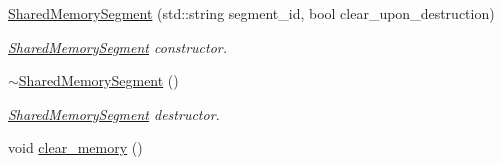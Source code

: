\begin{DoxyCompactItemize}
\item 
\hyperlink{classshared__memory_1_1SharedMemorySegment_ae984411227bd175e684f90c9c28c976c}{Shared\+Memory\+Segment} (std\+::string segment\+\_\+id, bool clear\+\_\+upon\+\_\+destruction)\hypertarget{classshared__memory_1_1SharedMemorySegment_ae984411227bd175e684f90c9c28c976c}{}\label{classshared__memory_1_1SharedMemorySegment_ae984411227bd175e684f90c9c28c976c}

\begin{DoxyCompactList}\small\item\em \hyperlink{classshared__memory_1_1SharedMemorySegment}{Shared\+Memory\+Segment} constructor. \end{DoxyCompactList}\item 
\hyperlink{classshared__memory_1_1SharedMemorySegment_a9f02fd9f35950df5f6ce7ceaba5fbb53}{$\sim$\+Shared\+Memory\+Segment} ()\hypertarget{classshared__memory_1_1SharedMemorySegment_a9f02fd9f35950df5f6ce7ceaba5fbb53}{}\label{classshared__memory_1_1SharedMemorySegment_a9f02fd9f35950df5f6ce7ceaba5fbb53}

\begin{DoxyCompactList}\small\item\em \hyperlink{classshared__memory_1_1SharedMemorySegment}{Shared\+Memory\+Segment} destructor. \end{DoxyCompactList}\item 
void \hyperlink{classshared__memory_1_1SharedMemorySegment_a0224739cd729dfb249c3d7882463e5eb}{clear\+\_\+memory} ()\hypertarget{classshared__memory_1_1SharedMemorySegment_a0224739cd729dfb249c3d7882463e5eb}{}\label{classshared__memory_1_1SharedMemorySegment_a0224739cd729dfb249c3d7882463e5eb}


\end{DoxyCompactItemize}
